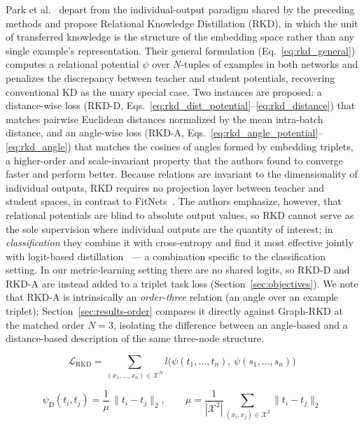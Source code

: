 \documentclass[11pt,letterpaper]{article}
\begin{document}
Park et al.~\cite{park2019relational} depart from the individual-output paradigm shared by
the preceding methods and propose Relational Knowledge Distillation (RKD), in which the
unit of transferred knowledge is the structure of the embedding space rather than any
single example's representation. Their general formulation (Eq.~\ref{eq:rkd_general})
computes a relational potential $\psi$ over $N$-tuples of examples in both networks and
penalizes the discrepancy between teacher and student potentials, recovering conventional
KD as the unary special case. Two instances are proposed: a distance-wise loss (RKD-D,
Eqs.~\ref{eq:rkd_dist_potential}--\ref{eq:rkd_distance}) that matches pairwise Euclidean
distances normalized by the mean intra-batch distance, and an angle-wise loss (RKD-A,
Eqs.~\ref{eq:rkd_angle_potential}--\ref{eq:rkd_angle}) that matches the cosines of angles
formed by embedding triplets, a higher-order and scale-invariant property that the authors
found to converge faster and perform better. Because relations are invariant to the
dimensionality of individual outputs, RKD requires no projection layer between teacher and
student spaces, in contrast to FitNets~\cite{romero2015fitnets}. The authors emphasize,
however, that relational potentials are blind to absolute output values, so RKD cannot
serve as the sole supervision where individual outputs are the quantity of interest; in
\emph{classification} they combine it with cross-entropy and find it most effective jointly
with logit-based distillation~\cite{hinton2015distilling} --- a combination specific to the
classification setting. In our metric-learning setting there are no shared logits, so RKD-D
and RKD-A are instead added to a triplet task loss (Section~\ref{sec:objectives}). We note
that RKD-A is intrinsically an \emph{order-three} relation (an angle over an example
triplet); Section~\ref{sec:results-order} compares it directly against Graph-RKD at the
matched order $N = 3$, isolating the difference between an angle-based and a distance-based
description of the same three-node structure.

\begin{equation}
    \mathcal{L}_{\text{RKD}} =
    \sum_{(x_1,\ldots,x_n)\in\mathcal{X}^N}
    l\big(\psi(t_1,\ldots,t_n),\, \psi(s_1,\ldots,s_n)\big)
    \label{eq:rkd_general}
\end{equation}

\begin{equation}
    \psi_{\text{D}}(t_i,t_j) = \frac{1}{\mu}\,\lVert t_i - t_j \rVert_2,
    \qquad
    \mu = \frac{1}{|\mathcal{X}^2|}
    \sum_{(x_i,x_j)\in\mathcal{X}^2}\lVert t_i - t_j\rVert_2
    \label{eq:rkd_dist_potential}
\end{equation}
\end{document}
